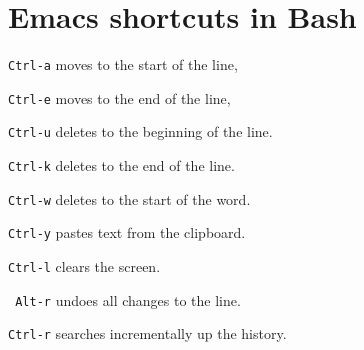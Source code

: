 \section{Emacs shortcuts in Bash}
\begin{enumx}
\item \texttt{Ctrl-a} moves to the start of the line,
\item \texttt{Ctrl-e} moves to the end of the line,
\item \texttt{Ctrl-u} deletes to the beginning of the line.
\item \texttt{Ctrl-k} deletes to the end of the line.
\item \texttt{Ctrl-w} deletes to the start of the word.
\item \texttt{Ctrl-y} pastes text from the clipboard.
\item \texttt{Ctrl-l} clears the screen.
\item \texttt{ Alt-r} undoes all changes to the line.
\item \texttt{Ctrl-r} searches incrementally up the history.
\end{enumx}
